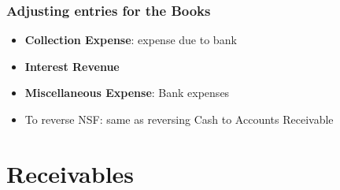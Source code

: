 \documentclass{article}
\begin{document}
\begin{multicols}{2}
\subsubsection{Adjusting entries for the Books}
\begin{itemize}
	\item \textbf{Collection Expense}: expense due to bank
	\item \textbf{Interest Revenue}
	\item \textbf{Miscellaneous Expense}: Bank expenses
	\item To reverse NSF: same as reversing Cash to Accounts Receivable
\end{itemize}
\section{Receivables}

\end{multicols}
\end{document}
